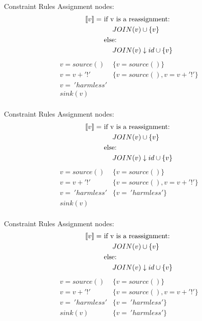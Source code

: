 \begin{frame}{Constraint Rules}
  Assignment nodes:
  \begin{align*}
  \llbracket v \rrbracket = &\text{ if v is a reassignment:}\\
  &\phantom{==}JOIN(v) \cup \{ v \}\\
  &\text{ else:}\\
  &\phantom{==}JOIN(v) \downarrow id \cup \{ v \}\\
  \end{align*}
    \noindent\makebox[\linewidth]{\rule{\textwidth}{0.4pt}}
  \[
  \begin{array}{ll}
    v = source() & \{v = source()\}\\
    v = v + '!' & \{v = source(), v = v + '!'\}\\
    v = \ 'harmless' &\\
    sink(v)& \\
  \end{array}
  \]
\end{frame}

\begin{frame}{Constraint Rules}
  Assignment nodes:
  \begin{align*}
  \llbracket v \rrbracket = &\text{ if v is a reassignment:}\\
  &\phantom{==}JOIN(v) \cup \{ v \}\\
  &\text{ else:}\\
  &\phantom{==}JOIN(v) \downarrow id \cup \{ v \}\\
  \end{align*}
    \noindent\makebox[\linewidth]{\rule{\textwidth}{0.4pt}}
  \[
  \begin{array}{ll}
    v = source() & \{v = source()\}\\
    v = v + '!' & \{v = source(), v = v + '!'\}\\
    v = \ 'harmless' & \{v = \ 'harmless'\}\\
    sink(v)& \\
  \end{array}
  \]
\end{frame}

\begin{frame}{Constraint Rules}
  Assignment nodes:
  \begin{align*}
  \llbracket v \rrbracket = &\text{ if v is a reassignment:}\\
  &\phantom{==}JOIN(v) \cup \{ v \}\\
  &\text{ else:}\\
  &\phantom{==}JOIN(v) \downarrow id \cup \{ v \}\\
  \end{align*}
    \noindent\makebox[\linewidth]{\rule{\textwidth}{0.4pt}}
  \[
  \begin{array}{ll}
    v = source() & \{v = source()\}\\
    v = v + '!' & \{v = source(), v = v + '!'\}\\
    v = \ 'harmless' & \{v = \ 'harmless'\}\\
    sink(v)& \{v = \ 'harmless'\}\\
  \end{array}
  \]
\end{frame}


